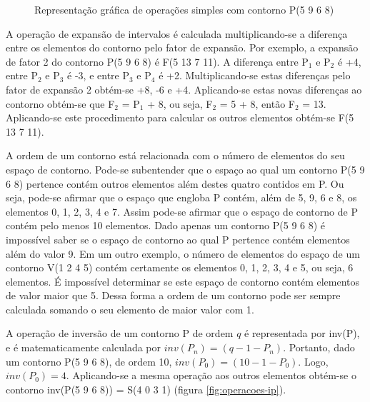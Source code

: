 \begin{figure}
  \centering
  \subfloat[Contorno P]{
    \texttt{[image: c-5968]}
    \label{fig:operacoes-p}
  }
  \subfloat[Inversão de P]{
    \texttt{[image: c-4031]}
    \label{fig:operacoes-ip}
  }
  \subfloat[Retrógrado de P]{
    \texttt{[image: c-8695]}
    \label{fig:operacoes-rp}
  }

  \subfloat[Rotação 1 de P]{
    \texttt{[image: c-9685]}
    \label{fig:operacoes-rr1}
  }
  \subfloat[Rotação 2 de P]{
    \texttt{[image: c-6859]}
    \label{fig:operacoes-rr2}
  }
  \subfloat[Rotação 3 de P]{
    \texttt{[image: c-8596]}
    \label{fig:operacoes-rr3}
  }
  \caption{Representação gráfica de operações simples com contorno P(5
  9 6 8)}
  \label{fig:operacoes-simples}
\end{figure}

A operação de expansão de intervalos é calculada multiplicando-se a
diferença entre os elementos do contorno pelo fator de expansão. Por
exemplo, a expansão de fator 2 do contorno P(5 9 6 8) é F(5 13 7
11). A diferença entre P$_1$ e P$_2$ é +4, entre P$_2$ e P$_3$ é -3, e
entre P$_3$ e P$_4$ é +2. Multiplicando-se estas diferenças pelo fator
de expansão 2 obtém-se +8, -6 e +4. Aplicando-se estas novas
diferenças ao contorno obtém-se que F$_2$ = P$_1$ + 8, ou seja, F$_2$
= 5 + 8, então F$_2$ = 13. Aplicando-se este procedimento para
calcular os outros elementos obtém-se F(5 13 7 11).

A ordem de um contorno está relacionada com o número de elementos do
seu espaço de contorno. Pode-se subentender que o espaço ao qual um
contorno P(5 9 6 8) pertence contém outros elementos além destes
quatro contidos em P. Ou seja, pode-se afirmar que o espaço que
engloba P contém, além de 5, 9, 6 e 8, os elementos 0, 1, 2, 3, 4 e
7. Assim pode-se afirmar que o espaço de contorno de P contém pelo
menos 10 elementos. Dado apenas um contorno P(5 9 6 8) é impossível
saber se o espaço de contorno ao qual P pertence contém elementos além
do valor 9. Em um outro exemplo, o número de elementos do espaço de um
contorno V(1 2 4 5) contém certamente os elementos 0, 1, 2, 3, 4 e 5,
ou seja, 6 elementos. É impossível determinar se este espaço de
contorno contém elementos de valor maior que 5. Dessa forma a ordem de
um contorno pode ser sempre calculada somando o seu elemento de maior
valor com 1.

A operação de inversão de um contorno P de ordem $q$ é representada
por inv(P), e é matematicamente calculada por
$inv(P_n)=(q-1-P_n)$. Portanto, dado um contorno P(5 9 6 8), de ordem
10, $inv(P_0)=(10-1-P_0)$. Logo, $inv(P_0)=4$. Aplicando-se a mesma
operação aos outros elementos obtém-se o contorno inv(P(5 9 6 8)) =
S(4 0 3 1) (figura \ref{fig:operacoes-ip}).


